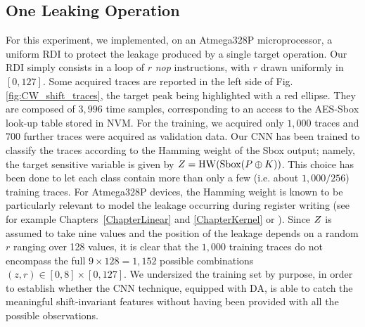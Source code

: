 \subsection{One Leaking Operation}\label{sec:soft}
For this experiment, we implemented, on an Atmega328P microprocessor, a uniform RDI \cite{tunstall2007efficient} to protect the leakage produced by a single target operation. Our RDI simply consists in a loop of  $r$ \emph{nop} instructions, with $r$  drawn uniformly in $[0,127]$. Some acquired traces are reported in the left side of Fig. \ref{fig:CW_shift_traces}, the target peak being highlighted with a red ellipse. They are composed of $3,996$ time samples, corresponding to an access to the AES-Sbox look-up table stored in NVM. For the training, we acquired only $1,000$ traces and 700 further traces were acquired as validation data. Our CNN has been trained to classify the traces according to the Hamming weight of the Sbox output; namely, the target sensitive variable is given by $Z = \mathrm{HW}(\mathrm{Sbox}(P\oplus K))$. This choice has been done to let each class contain more than only a few (i.e. about $1,000/256$) training traces.
For Atmega328P devices, the Hamming weight is known to be particularly relevant to model the leakage occurring during register writing (see for example Chapters~\ref{ChapterLinear} and \ref{ChapterKernel} or \cite{BelaidCFGKP15}). Since $Z$ is assumed to take nine values and the position of the leakage depends on a random $r$ ranging over 128 values, it is clear that the $1,000$ training traces do not encompass the full $9 \times 128=1,152$ possible combinations $(z,r)\in [0,8]\times[0,127]$. We undersized the training set by purpose, in order to establish whether the CNN technique, equipped with DA, is able to catch the meaningful shift-invariant features without having been provided with all the possible observations.\\


